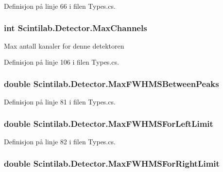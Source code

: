 Definisjon på linje 66 i filen Types.\+cs.

\hypertarget{class_scintilab_1_1_detector_a3292810e6f1dd86ceeb6e11da3389657}{
\subsubsection[{Max\+Channels}]{\setlength{\rightskip}{0pt plus 5cm}int Scintilab.\+Detector.\+Max\+Channels}}\label{class_scintilab_1_1_detector_a3292810e6f1dd86ceeb6e11da3389657}
Max antall kanaler for denne detektoren 

Definisjon på linje 106 i filen Types.\+cs.

\hypertarget{class_scintilab_1_1_detector_a54469032972e274893df0654113c2e10}{
\subsubsection[{Max\+F\+W\+H\+M\+S\+Between\+Peaks}]{\setlength{\rightskip}{0pt plus 5cm}double Scintilab.\+Detector.\+Max\+F\+W\+H\+M\+S\+Between\+Peaks}}\label{class_scintilab_1_1_detector_a54469032972e274893df0654113c2e10}


Definisjon på linje 81 i filen Types.\+cs.

\hypertarget{class_scintilab_1_1_detector_a2cb757183e87f6350f473d1b9c569ca5}{
\subsubsection[{Max\+F\+W\+H\+M\+S\+For\+Left\+Limit}]{\setlength{\rightskip}{0pt plus 5cm}double Scintilab.\+Detector.\+Max\+F\+W\+H\+M\+S\+For\+Left\+Limit}}\label{class_scintilab_1_1_detector_a2cb757183e87f6350f473d1b9c569ca5}


Definisjon på linje 82 i filen Types.\+cs.

\hypertarget{class_scintilab_1_1_detector_a6aa0a6c4d52a5651ba1ed2c52d07b65b}{
\subsubsection[{Max\+F\+W\+H\+M\+S\+For\+Right\+Limit}]{\setlength{\rightskip}{0pt plus 5cm}double Scintilab.\+Detector.\+Max\+F\+W\+H\+M\+S\+For\+Right\+Limit}}\label{class_scintilab_1_1_detector_a6aa0a6c4d52a5651ba1ed2c52d07b65b}


